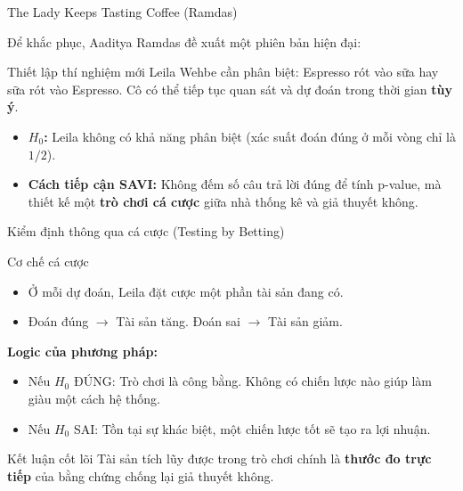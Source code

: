 \begin{frame}{The Lady Keeps Tasting Coffee (Ramdas)}

Để khắc phục, Aaditya Ramdas đề xuất một phiên bản hiện đại:

\begin{block}{Thiết lập thí nghiệm mới}
Leila Wehbe cần phân biệt: Espresso rót vào sữa hay sữa rót vào Espresso. Cô có thể tiếp tục quan sát và dự đoán trong thời gian \textbf{tùy ý}.
\end{block}

\begin{itemize}
    \item \textbf{$H_0$:} Leila không có khả năng phân biệt (xác suất đoán đúng ở mỗi vòng chỉ là $1/2$).
    \item \textbf{Cách tiếp cận SAVI:} Không đếm số câu trả lời đúng để tính p-value, mà thiết kế một \textbf{trò chơi cá cược} giữa nhà thống kê và giả thuyết không.
\end{itemize}

\end{frame}

\begin{frame}{Kiểm định thông qua cá cược (Testing by Betting)}

\begin{block}{Cơ chế cá cược}
\begin{itemize}
    \item Ở mỗi dự đoán, Leila đặt cược một phần tài sản đang có.
    \item Đoán đúng $\rightarrow$ Tài sản tăng. Đoán sai $\rightarrow$ Tài sản giảm.
\end{itemize}
\end{block}

\textbf{Logic của phương pháp:}
\begin{itemize}
    \item Nếu $H_0$ ĐÚNG: Trò chơi là công bằng. Không có chiến lược nào giúp làm giàu một cách hệ thống.
    \item Nếu $H_0$ SAI: Tồn tại sự khác biệt, một chiến lược tốt sẽ tạo ra lợi nhuận.
\end{itemize}

\begin{alertblock}{Kết luận cốt lõi}
Tài sản tích lũy được trong trò chơi chính là \textbf{thước đo trực tiếp} của bằng chứng chống lại giả thuyết không.
\end{alertblock}

\end{frame}

